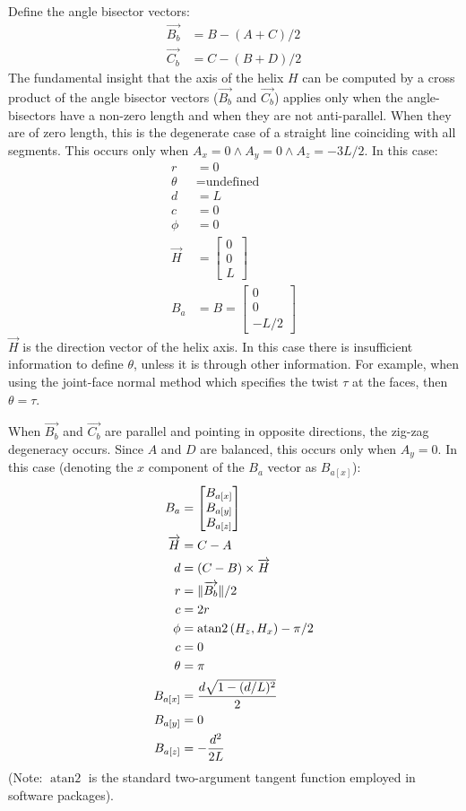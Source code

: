 \documentclass[11pt]{article}
\DeclarePairedDelimiter{\norm}{\lVert}{\rVert}
\DeclareMathOperator{\atantwo}{atan2}
\begin{document}
{Define the angle bisector vectors:
\begin{align}
  \overrightarrow{B_b} &= B - (A + C)/2 \\
  \overrightarrow{C_b} &= C - (B + D)/2
  \end{align}
The fundamental insight that the axis of the helix $H$ can be
computed by a cross product of the angle bisector
vectors ($\overrightarrow{B_b}$ and $\overrightarrow{C_b}$) applies only
when the angle-bisectors have a non-zero length and when
they are not anti-parallel. When they are of zero length, this is
the degenerate case of a straight line coinciding with all segments.
This occurs only when $A_x = 0 \wedge A_y = 0 \wedge A_z = -3L/2$.
In this case:
\begin{align}
  r &= 0 \\
  \theta &= \text{undefined}\\
  d &= L \\
  c &= 0 \\
  \phi &= 0 \\
  \overrightarrow{H} &=  \begin{bmatrix} 0 \\ 0 \\ L  \end{bmatrix} \\
  B_a &= B = \begin{bmatrix} 0 \\ 0 \\ -L/2  \end{bmatrix}
\end{align}
$\overrightarrow{H}$ is the direction vector of the helix axis.
In this case there is insufficient information to define $\theta$,
unless it is through other information. For example, when using
the joint-face normal method which specifies
the twist $\tau$ at the faces, then $\theta = \tau$.

When $\overrightarrow{B_b}$ and $\overrightarrow{C_b}$ are parallel and pointing in opposite directions,
the zig-zag degeneracy occurs. Since
$A$ and $D$ are balanced, this occurs only when $A_y = 0$.
In this case (denoting the $x$ component of the $B_a$ vector as $B_{a[x]}$):
\begin{align}
  B_{a} &= \begin{bmatrix} B_{a[x]} \\ B_{a[y]} \\ B_{a[z]}  \end{bmatrix} \\
  \overrightarrow{H} &=  C - A \\
  d &= (C - B) \times \overrightarrow{H} \\
  r &= \norm{\overrightarrow{B_b}} / 2 \\
  c &= 2 r\\
  \phi &= \atantwo{(H_z,H_x)} - \pi/2 \\
  c &= 0 \\
  \theta &= \pi \\
  B_{a[x]} &= \frac{d\sqrt{1 - (d/L)^2}}{2} \\
  B_{a[y]} &= 0 \\
  B_{a[z]} &= -\frac{d^2}{2L}
\end{align}
(Note: $\atantwo$ is the standard two-argument tangent function employed in software packages).

}
\end{document}
